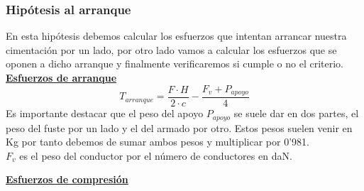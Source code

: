 \documentclass{article}
\begin{document}
        \subsubsection{Hipótesis al arranque}
            {
            \begin{figure}
            \end{figure}
            En esta hipótesis debemos calcular los esfuerzos que intentan arrancar nuestra cimentación por un lado, por otro lado vamos a calcular los esfuerzos que se oponen a dicho arranque y finalmente verificaremos si cumple o no el criterio.\\
            
            \textbf{\underline{Esfuerzos de arranque}}
            \begin{equation*}
                T_{arranque} = \frac{F \cdot H}{2 \cdot c} - \frac{F_v + P_{apoyo}}{4}
            \end{equation*}
            Es importante destacar que el peso del apoyo $P_{apoyo}$ se suele dar en dos partes, el peso del fuste por un lado y el del armado por otro.
            Estos pesos suelen venir en Kg por tanto debemos de sumar ambos pesos y multiplicar por 0'981.
            \\
            
            $F_v$ es el peso del conductor por el número de conductores en daN.
            }
            \newpage
            \textbf{\underline{Esfuerzos de compresión}} \\
            
\end{document}
